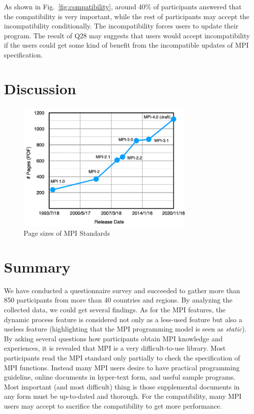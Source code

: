 \documentclass[preprint,5p,times]{elsarticle}
\begin{document}
As shown in Fig.~\ref{fig:compatibility}, around 40\% of participants
answered that the compatibility is very important, while the rest of
participants may accept the incompatibility conditionally. The
incompatibility forces users to update their program. The result of
Q28 may suggests that users would accept incompatibility if the users
could get some kind of benefit from the incompatible updates of MPI
specification.

\section{Discussion}

\begin{figure}[htb]
\begin{center}
\includegraphics[width=8.7cm]{Figs/MPI-Standards.pdf}
\caption{Page sizes of MPI Standards}
\label{fig:mpi-standards}
\end{center}
\end{figure}

\section{Summary}

We have conducted a questionnaire survey and succeeded to gather more
than 850 participants from more than 40 countries and regions. By
analyzing the collected data, we could get several findings. As for
the MPI features, the dynamic process feature is considered not only
as a less-used feature but also a useless feature (highlighting that
the MPI programming model is seen as {\em static}). By asking several
questions how participants obtain MPI knowledge and experiences, it is
revealed that MPI is a very difficult-to-use library.
Most participants read the MPI standard only partially to check the
specification of MPI functions. Instead many MPI users desire to have
practical programming guideline, online documents in
hyper-text form, and useful sample programs. Most important
(and most difficult) thing is those supplemental
documents in any form must be up-to-dated and thorough. For the
compatibility, many MPI users may accept to sacrifice the
compatibility to get more performance.
\end{document}
